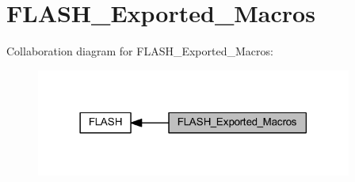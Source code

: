 \hypertarget{group___f_l_a_s_h___exported___macros}{}\section{F\+L\+A\+S\+H\+\_\+\+Exported\+\_\+\+Macros}
\label{group___f_l_a_s_h___exported___macros}
Collaboration diagram for F\+L\+A\+S\+H\+\_\+\+Exported\+\_\+\+Macros\+:
\nopagebreak
\begin{figure}[H]
\begin{center}
\leavevmode
\includegraphics[width=294pt]{group___f_l_a_s_h___exported___macros}
\end{center}
\end{figure}
